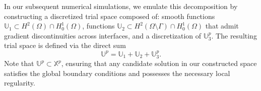 \documentclass[oneside]{article}
\newcounter{reviewer}
\newcounter{point}[reviewer]
\newcommand{\blue}[1]{{\color{blue}{#1}}}
\begin{document}
\noindent In our subsequent numerical simulations, we emulate this decomposition by constructing a discretized trial space composed of: smooth functions $\mathbb{U}_1\subset H^2(\Omega)\cap H^1_0(\Omega)$, functions $\mathbb{U}_2\subset H^2(\Omega\setminus\Gamma)\cap H^1_0(\Omega)$ that admit gradient discontinuities across interfaces, and a discretization of $\mathbb{U}^p_3$. The resulting trial space is defined via the direct sum
\begin{equation}\label{eq2_space_decomposition}
    \mathbb{U}^p = \mathbb{U}_1+\mathbb{U}_2+\mathbb{U}^p_3. 
\end{equation}
\noindent Note that $\mathbb{U}^p \subset \mathbb{X}^p$, ensuring that any candidate solution in our constructed space satisfies the global boundary conditions and possesses the necessary local regularity.




\end{document}
